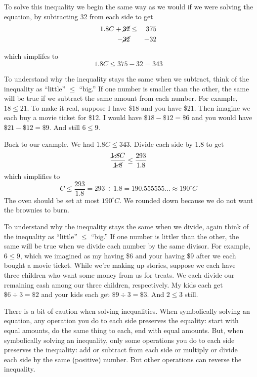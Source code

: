 To solve this inequality we begin the same way as we would if we were solving the equation, by subtracting 32 from each side to get
 \begin{eqnarray*}
1.8C + \cancel{32}& \le &375  \\
-\cancel{32}& & -32  \\
\end{eqnarray*}

\vspace{-.5in} %
\noindent which simplifes to $$1.8C\le375-32=343$$  

To understand why the inequality stays the same when we subtract, think of the inequality as ``little'' $\le$ ``big.''   If one number is smaller than the other, the same will be true if we subtract the same amount from each number.  For example, $18 \le 21$.  To make it real, suppose I have \$18 and you have \$21. Then imagine we each buy a movie ticket for \$12.  I would have $\$18-\$12 = \$6$ and you would have $\$21-\$12 = \$9$.  And still $6 \le 9$. 

Back to our example.  We had  $1.8C\le343$. Divide each side by 1.8 to get
$$\frac{\cancel{1.8}C}{\cancel{1.8} }\le \frac{293}{1.8}$$
which simplifies to $$C\le \frac{293}{1.8}= 293 \div 1.8 = 190.555555\ldots \approx 190^\circ C$$
The oven should be set at most $190^\circ C$.  We rounded down because we do not want the brownies to burn.

To understand why the inequality stays the same when we divide, again think of the inequality as ``little'' $\le$ ``big.''  If one number is littler than the other, the same will be true when we divide each number by the same divisor.  For example, $6 \le 9$, which we imagined as my having \$6 and your having \$9 after we each bought a movie ticket.  While we're making up stories, suppose we each have three children who want some money from us for treats.  We each divide our remaining cash among our three children, respectively.  My kids each get $\$6\div3 =\$2$ and your kids each get $\$9\div 3 = \$3$.  And $2 \le 3$ still.

There is a bit of caution when solving inequalities.  When symbolically solving an equation, any operation you do to each side preserves the equality: start with equal amounts, do the same thing to each, end with equal amounts.  But, when symbolically solving an  inequality, only some operations you do to each side preserves the inequality: add or subtract from each side or multiply or divide each side by the same (positive) number.  But other operations can reverse the inequality.  


